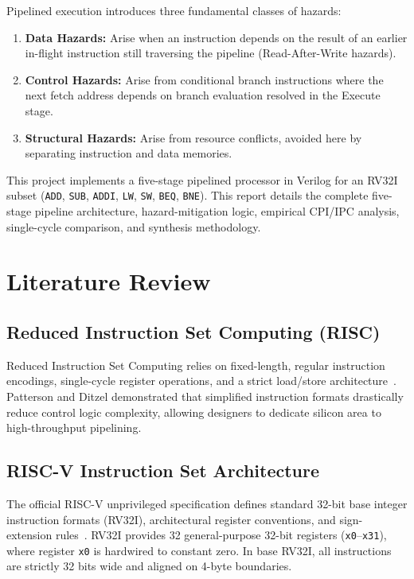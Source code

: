 \documentclass[conference]{IEEEtran}
\begin{document}
Pipelined execution introduces three fundamental classes of hazards:
\begin{enumerate}
    \item \textbf{Data Hazards:} Arise when an instruction depends on the result of an earlier in-flight instruction still traversing the pipeline (Read-After-Write hazards).
    \item \textbf{Control Hazards:} Arise from conditional branch instructions where the next fetch address depends on branch evaluation resolved in the Execute stage.
    \item \textbf{Structural Hazards:} Arise from resource conflicts, avoided here by separating instruction and data memories.
\end{enumerate}

This project implements a five-stage pipelined processor in Verilog for an RV32I subset (\texttt{ADD}, \texttt{SUB}, \texttt{ADDI}, \texttt{LW}, \texttt{SW}, \texttt{BEQ}, \texttt{BNE}). This report details the complete five-stage pipeline architecture, hazard-mitigation logic, empirical CPI/IPC analysis, single-cycle comparison, and synthesis methodology.

\section{Literature Review}

\subsection{Reduced Instruction Set Computing (RISC)}
Reduced Instruction Set Computing relies on fixed-length, regular instruction encodings, single-cycle register operations, and a strict load/store architecture~\cite{b1}. Patterson and Ditzel demonstrated that simplified instruction formats drastically reduce control logic complexity, allowing designers to dedicate silicon area to high-throughput pipelining.

\subsection{RISC-V Instruction Set Architecture}
The official RISC-V unprivileged specification defines standard 32-bit base integer instruction formats (RV32I), architectural register conventions, and sign-extension rules~\cite{b2}. RV32I provides 32 general-purpose 32-bit registers (\texttt{x0}--\texttt{x31}), where register \texttt{x0} is hardwired to constant zero. In base RV32I, all instructions are strictly 32 bits wide and aligned on 4-byte boundaries.
\end{document}
